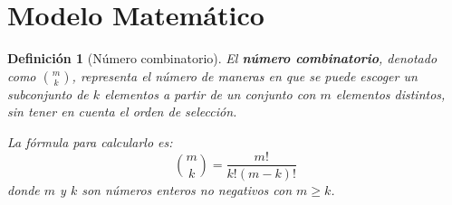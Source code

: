 \documentclass[12pt,a4paper]{book}
\newtheorem{defi}{Definición}[section]
\begin{document}
\section{Modelo Matemático}

\begin{defi}[Número combinatorio]
\label{def:combinatorio}
El \textbf{número combinatorio}, denotado como $\binom{m}{k}$, representa el número de maneras en que se puede escoger un subconjunto de $k$ elementos a partir de un conjunto con $m$ elementos distintos, sin tener en cuenta el orden de selección.

La fórmula para calcularlo es:
$$ \binom{m}{k} = \frac{m!}{k!(m-k)!} $$
donde $m$ y $k$ son números enteros no negativos con $m \ge k$.
\end{defi}




\nocite{*}


\end{document}
